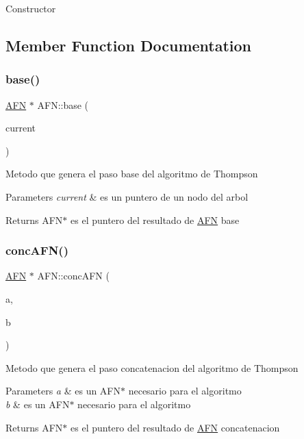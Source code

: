 Constructor 

\subsection{Member Function Documentation}
\hypertarget{class_a_f_n_ad4468eb7ea1fbf8a3d914c75984e0415}{}\label{class_a_f_n_ad4468eb7ea1fbf8a3d914c75984e0415} 
\subsubsection{\texorpdfstring{base()}{base()}}
{\footnotesize\ttfamily \hyperlink{class_a_f_n}{A\+FN} $\ast$ A\+F\+N\+::base (\begin{DoxyParamCaption}\item[{\hyperlink{structnode}{node} $\ast$}]{current }\end{DoxyParamCaption})}

Metodo que genera el paso base del algoritmo de Thompson 
\begin{DoxyParams}{Parameters}
{\em current} & es un puntero de un nodo del arbol \\
\hline
\end{DoxyParams}
\begin{DoxyReturn}{Returns}
A\+F\+N$\ast$ es el puntero del resultado de \hyperlink{class_a_f_n}{A\+FN} base 
\end{DoxyReturn}
\hypertarget{class_a_f_n_acd49864e85e53873851b5cac06c7d04b}{}\label{class_a_f_n_acd49864e85e53873851b5cac06c7d04b} 
\subsubsection{\texorpdfstring{conc\+A\+F\+N()}{concAFN()}}
{\footnotesize\ttfamily \hyperlink{class_a_f_n}{A\+FN} $\ast$ A\+F\+N\+::conc\+A\+FN (\begin{DoxyParamCaption}\item[{\hyperlink{class_a_f_n}{A\+FN} $\ast$}]{a,  }\item[{\hyperlink{class_a_f_n}{A\+FN} $\ast$}]{b }\end{DoxyParamCaption})}

Metodo que genera el paso concatenacion del algoritmo de Thompson 
\begin{DoxyParams}{Parameters}
{\em a} & es un A\+F\+N$\ast$ necesario para el algoritmo \\
\hline
{\em b} & es un A\+F\+N$\ast$ necesario para el algoritmo \\
\hline
\end{DoxyParams}
\begin{DoxyReturn}{Returns}
A\+F\+N$\ast$ es el puntero del resultado de \hyperlink{class_a_f_n}{A\+FN} concatenacion 
\end{DoxyReturn}
\hypertarget{class_a_f_n_a757046dcf9f6dddd5ce67716ed2c5857}{}\label{class_a_f_n_a757046dcf9f6dddd5ce67716ed2c5857} 
